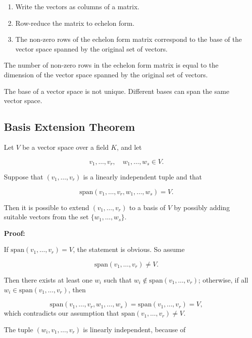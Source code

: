 \begin{enumerate}

	\item Write the vectors as columns of a matrix.

	\item Row-reduce the matrix to echelon form.

	\item The non-zero rows of the echelon form matrix correspond to the base of the vector space 
	      spanned by the original set of vectors.

\end{enumerate}

The number of non-zero rows in the echelon form matrix is equal to the dimension of the vector space 
spanned by the original set of vectors.

The base of a vector space is not unique. Different bases can span the same vector space.

\subsection{Basis Extension Theorem}

Let \(V\) be a vector space over a field \(K\), and let 

\[
	v_1, \ldots, v_r,\quad w_1, \ldots, w_s \in V.
\]

Suppose that \((v_1, \ldots, v_r)\) is a linearly independent tuple and that

\[
	\text{span}(v_1, \ldots, v_r, w_1, \ldots, w_s) = V.
\]

Then it is possible to extend \((v_1, \ldots, v_r)\) to a basis of \(V\) by possibly adding suitable 
vectors from the set \(\{w_1, \ldots, w_s\}\).

\textbf{Proof:}

If \(\text{span}(v_1, \ldots, v_r) = V\), the statement is obvious. So assume

\[
	\text{span}(v_1, \ldots, v_r) \neq V.
\]

Then there exists at least one \(w_i\) such that \(w_i \notin \text{span}(v_1, \ldots, v_r)\); 
otherwise, if all \(w_i \in \text{span}(v_1, \ldots, v_r)\), then

\[
	\text{span}(v_1, \ldots, v_r, w_1, \ldots, w_s) = \text{span}(v_1, \ldots, v_r) = V,
\]
which contradicts our assumption that \(\text{span}(v_1, \ldots, v_r) \neq V\).

The tuple \((w_i, v_1, \ldots, v_r)\) is linearly independent, because of

